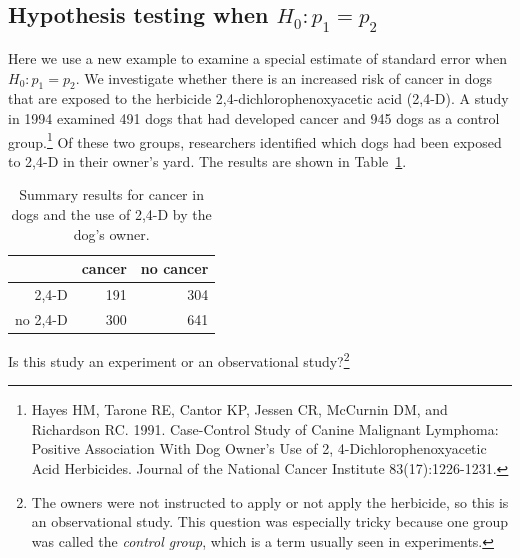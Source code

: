


\subsection{Hypothesis testing when $H_0: p_1=p_2$}
\label{pooledHTForProportionsSection}


Here we use a new example to examine a special estimate of standard error when $H_0: p_1 = p_2$. We investigate whether there is an increased risk of cancer in dogs that are exposed to the herbicide 2,4-dichlorophenoxyacetic acid (2,4-D). A study in 1994 examined 491 dogs that had developed cancer and 945 dogs as a control group.\footnote{Hayes HM, Tarone RE, Cantor KP, Jessen CR, McCurnin DM, and Richardson RC. 1991. Case-Control Study of Canine Malignant Lymphoma: Positive Association With Dog Owner's Use of 2, 4-Dichlorophenoxyacetic Acid Herbicides. Journal of the National Cancer Institute 83(17):1226-1231.} Of these two groups, researchers identified which dogs had been exposed to 2,4-D in their owner's yard. The results are shown in Table~\ref{24DAndCancerInDogs}.

\begin{table}[h]
\centering
\begin{tabular}{rrr}
  \hline
 & cancer & no cancer \\
  \hline
2,4-D & 191 & 304 \\
no 2,4-D & 300 & 641 \\
   \hline
\end{tabular}
\caption{Summary results for cancer in dogs and the use of 2,4-D by the dog's owner.}
\label{24DAndCancerInDogs}
\end{table}

\begin{exercise}
Is this study an experiment or an observational study?\footnote{The owners were not instructed to apply or not apply the herbicide, so this is an observational study. This question was especially tricky because one group was called the \emph{control group}, which is a term usually seen in experiments.}
\end{exercise}


